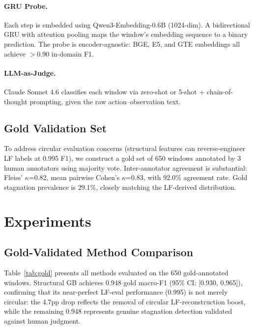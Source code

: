 \documentclass[11pt,a4paper]{article}
\begin{document}
\paragraph{GRU Probe.}
Each step is embedded using Qwen3-Embedding-0.6B (1024-dim).
A bidirectional GRU with attention pooling maps the window's embedding sequence to a binary prediction.
The probe is encoder-agnostic: BGE, E5, and GTE embeddings all achieve $>$0.90 in-domain F1.

\paragraph{LLM-as-Judge.}
Claude Sonnet 4.6 classifies each window via zero-shot or 5-shot + chain-of-thought prompting, given the raw action--observation text.

\subsection{Gold Validation Set}

To address circular evaluation concerns (structural features can reverse-engineer LF labels at 0.995 F1), we construct a gold set of 650 windows annotated by 3 human annotators using majority vote.
Inter-annotator agreement is substantial: Fleiss' $\kappa$=0.82, mean pairwise Cohen's $\kappa$=0.83, with 92.0\% agreement rate.
Gold stagnation prevalence is 29.1\%, closely matching the LF-derived distribution.

\section{Experiments}
\label{sec:experiments}

\subsection{Gold-Validated Method Comparison}
\label{sec:gold}

Table~\ref{tab:gold} presents all methods evaluated on the 650 gold-annotated windows.
Structural GB achieves 0.948 gold macro-F1 (95\% CI: [0.930, 0.965]), confirming that its near-perfect LF-eval performance (0.995) is not merely circular: the 4.7pp drop reflects the removal of circular LF-reconstruction boost, while the remaining 0.948 represents genuine stagnation detection validated against human judgment.
\end{document}
